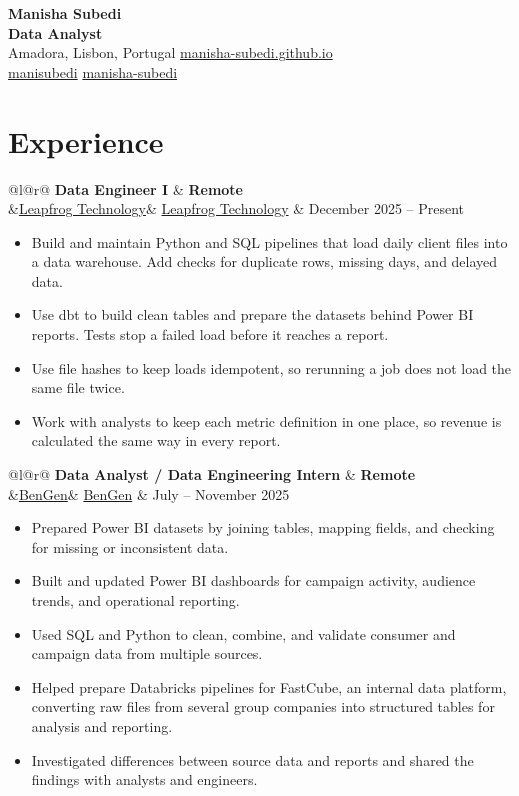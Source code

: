\documentclass[10pt,a4paper]{article}
\makeatletter
\newcommand{\resumeSubheading}[4]{%
    \noindent%
    \begin{tabular*}{\textwidth}{@{}l@{\extracolsep{\fill}}r@{}}
        \textbf{#1} & \textbf{#3} \\
        \ifx&#2& \else #2 \fi & #4 \\
    \end{tabular*}%
    \vspace{-2pt}%
}
\makeatother
\begin{document}
\begin{center}
    {\Huge\bfseries Manisha Subedi}\\[2pt]
    {\large\bfseries Data Analyst}\\[5pt]
     Amadora, Lisbon, Portugal \quad
     \href{https://manisha-subedi.github.io}{manisha-subedi.github.io} \\[4pt]
     \href{https://pt.linkedin.com/in/manisubedi}{manisubedi} \quad
     \href{https://github.com/manisha-subedi}{manisha-subedi}
\end{center}

\section{Experience}

\resumeSubheading
    {Data Engineer I}{\href{https://www.lftechnology.com}{\textcolor{linkblue}{Leapfrog Technology}}}
    {Remote}{December 2025 -- Present}

\begin{itemize}
    \item Build and maintain Python and SQL pipelines that load daily client files into a data warehouse. Add checks for duplicate rows, missing days, and delayed data.
    \item Use dbt to build clean tables and prepare the datasets behind Power BI reports. Tests stop a failed load before it reaches a report.
    \item Use file hashes to keep loads idempotent, so rerunning a job does not load the same file twice.
    \item Work with analysts to keep each metric definition in one place, so revenue is calculated the same way in every report.
\end{itemize}

\vspace{2pt}

\resumeSubheading
    {Data Analyst / Data Engineering Intern}{\href{https://bengen.com}{\textcolor{linkblue}{BenGen}}}
    {Remote}{July -- November 2025}

\begin{itemize}
    \item Prepared Power BI datasets by joining tables, mapping fields, and checking for missing or inconsistent data.
    \item Built and updated Power BI dashboards for campaign activity, audience trends, and operational reporting.
    \item Used SQL and Python to clean, combine, and validate consumer and campaign data from multiple sources.
    \item Helped prepare Databricks pipelines for FastCube, an internal data platform, converting raw files from several group companies into structured tables for analysis and reporting.
    \item Investigated differences between source data and reports and shared the findings with analysts and engineers.
\end{itemize}
\end{document}
